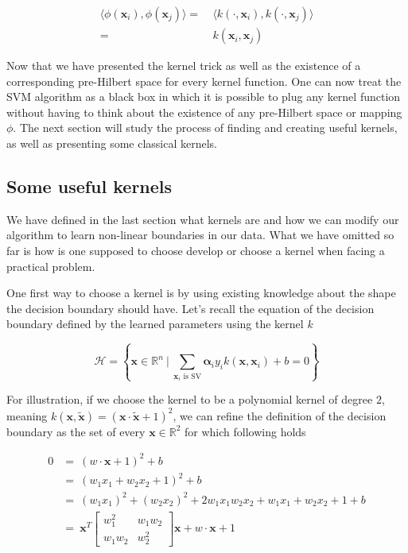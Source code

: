 \begin{equation*}
  \begin{aligned}
    \langle \phi(\mathbf{x}_i), \phi(\mathbf{x}_j)\rangle =\ &\langle k\left(\cdot, \mathbf{x}_i\right), k\left(\cdot, \mathbf{x}_j\right)\rangle \\
    =\ &k(\mathbf{x}_i, \mathbf{x}_j)
  \end{aligned}
\end{equation*}

Now that we have presented the kernel trick as well as the existence of a corresponding pre-Hilbert space for every kernel function. One can now treat the SVM algorithm as a black box in which it is possible to plug any kernel function without having to think about the existence of any pre-Hilbert space or mapping $\phi$. The next section will study the process of finding and creating useful kernels, as well as presenting some classical kernels.

\subsection {Some useful kernels}

We have defined in the last section what kernels are and how we can modify our algorithm to learn non-linear boundaries in our data. What we have omitted so far is how is one supposed to choose develop or choose a kernel when facing a practical problem.

One first way to choose a kernel is by using existing knowledge about the shape the decision boundary should have. Let's recall the equation of the decision boundary defined by the learned parameters using the kernel $k$

\begin{equation*}
  \mathscr{H} = \left\{\mathbf{x} \in \mathbb{R}^n\ |\ \sum_{\mathbf{x}_i \text{ is SV}}\boldsymbol{\alpha}_iy_ik\left(\mathbf{x}, \mathbf{x}_i\right) + b = 0\right\}
\end{equation*}

For illustration, if we choose the kernel to be a polynomial kernel of degree $2$, meaning $k\left(\mathbf{x}, \mathbf{\tilde{x}}\right) = \left(\mathbf{x} \cdot \mathbf{\tilde{x}} + 1\right)^2$, we can refine the definition of the decision boundary as the set of every $\mathbf{x} \in \mathbb{R}^2$ for which following holds

\begin{equation*}
  \begin{aligned}
    0 &=\ \left(w \cdot \mathbf{x} + 1\right)^2 + b\\
      &=\ \left(w_1x_1 + w_2x_2 + 1\right)^2 + b\\
      &=\ (w_1x_1)^2 + (w_2x_2)^2 + 2w_1x_1w_2x_2 + w_1x_1 + w_2x_2 + 1 + b\\
      &=\ \mathbf{x}^T\begin{bmatrix}w_1^2 & w_1w_2\\ w_1w_2 & w_2^2\end{bmatrix}\mathbf{x} + w \cdot \mathbf{x} + 1 
  \end{aligned}
\end{equation*}

